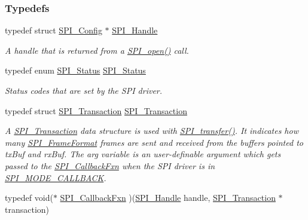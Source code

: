 \subsubsection*{Typedefs}
\begin{DoxyCompactItemize}
\item 
typedef struct \hyperlink{struct_s_p_i___config}{S\-P\-I\-\_\-\-Config} $\ast$ \hyperlink{_s_p_i_8h_a728806534c3c3e8675cfbfb7d8e36f13}{S\-P\-I\-\_\-\-Handle}
\begin{DoxyCompactList}\small\item\em A handle that is returned from a \hyperlink{_s_p_i_8h_a62cfe494cb1df47cd602e8747e894fd1}{S\-P\-I\-\_\-open()} call. \end{DoxyCompactList}\item 
typedef enum \hyperlink{_s_p_i_8h_a913c57c335166de9caa54b7eb9ad95fb}{S\-P\-I\-\_\-\-Status} \hyperlink{_s_p_i_8h_adf1c6e6f919dd9f6887da6590a52fd6a}{S\-P\-I\-\_\-\-Status}
\begin{DoxyCompactList}\small\item\em Status codes that are set by the S\-P\-I driver. \end{DoxyCompactList}\item 
typedef struct \hyperlink{struct_s_p_i___transaction}{S\-P\-I\-\_\-\-Transaction} \hyperlink{_s_p_i_8h_a906af7b4126dcfc52dfa905eb08408fc}{S\-P\-I\-\_\-\-Transaction}
\begin{DoxyCompactList}\small\item\em A \hyperlink{struct_s_p_i___transaction}{S\-P\-I\-\_\-\-Transaction} data structure is used with \hyperlink{_s_p_i_8h_a989e17f96b54fcc3dc2cac5f8ac6bdb2}{S\-P\-I\-\_\-transfer()}. It indicates how many \hyperlink{_s_p_i_8h_a53949638d43ae7bf71b74c2b136ad206}{S\-P\-I\-\_\-\-Frame\-Format} frames are sent and received from the buffers pointed to tx\-Buf and rx\-Buf. The arg variable is an user-\/definable argument which gets passed to the \hyperlink{_s_p_i_8h_aeb03e7608a14021c3b0acf92c90e2168}{S\-P\-I\-\_\-\-Callback\-Fxn} when the S\-P\-I driver is in \hyperlink{_s_p_i_8h_ab9ea76c6529d6076eee5e1c4a5a92c6fa5631e69925c47a62a261c78ebbda39fb}{S\-P\-I\-\_\-\-M\-O\-D\-E\-\_\-\-C\-A\-L\-L\-B\-A\-C\-K}. \end{DoxyCompactList}\item 
typedef void($\ast$ \hyperlink{_s_p_i_8h_aeb03e7608a14021c3b0acf92c90e2168}{S\-P\-I\-\_\-\-Callback\-Fxn} )(\hyperlink{_s_p_i_8h_a728806534c3c3e8675cfbfb7d8e36f13}{S\-P\-I\-\_\-\-Handle} handle, \hyperlink{struct_s_p_i___transaction}{S\-P\-I\-\_\-\-Transaction} $\ast$transaction)

\end{DoxyCompactItemize}
